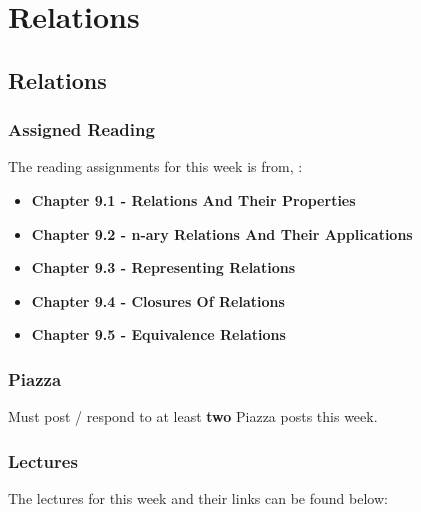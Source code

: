 \clearpage

\renewcommand{\ChapTitle}{Relations}
\renewcommand{\SectionTitle}{Relations}

\chapter{\ChapTitle}
\section{\SectionTitle}

\subsection{Assigned Reading}

The reading assignments for this week is from, \Textbook:

\begin{itemize}
    \item \textbf{Chapter 9.1 - Relations And Their Properties}
    \item \textbf{Chapter 9.2 - n-ary Relations And Their Applications}
    \item \textbf{Chapter 9.3 - Representing Relations}
    \item \textbf{Chapter 9.4 - Closures Of Relations}
    \item \textbf{Chapter 9.5 - Equivalence Relations}
\end{itemize}

\subsection{Piazza}

Must post / respond to at least \textbf{two} Piazza posts this week.

\subsection{Lectures}

The lectures for this week and their links can be found below:

